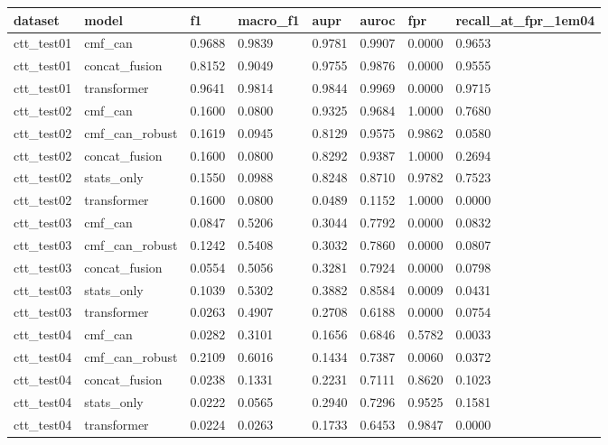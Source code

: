 \begin{tabular}{llllllll}
\toprule
dataset & model & f1 & macro\_f1 & aupr & auroc & fpr & recall\_at\_fpr\_1em04 \\
\midrule
ctt\_test01 & cmf\_can & 0.9688 & 0.9839 & 0.9781 & 0.9907 & 0.0000 & 0.9653 \\
ctt\_test01 & concat\_fusion & 0.8152 & 0.9049 & 0.9755 & 0.9876 & 0.0000 & 0.9555 \\
ctt\_test01 & transformer & 0.9641 & 0.9814 & 0.9844 & 0.9969 & 0.0000 & 0.9715 \\
ctt\_test02 & cmf\_can & 0.1600 & 0.0800 & 0.9325 & 0.9684 & 1.0000 & 0.7680 \\
ctt\_test02 & cmf\_can\_robust & 0.1619 & 0.0945 & 0.8129 & 0.9575 & 0.9862 & 0.0580 \\
ctt\_test02 & concat\_fusion & 0.1600 & 0.0800 & 0.8292 & 0.9387 & 1.0000 & 0.2694 \\
ctt\_test02 & stats\_only & 0.1550 & 0.0988 & 0.8248 & 0.8710 & 0.9782 & 0.7523 \\
ctt\_test02 & transformer & 0.1600 & 0.0800 & 0.0489 & 0.1152 & 1.0000 & 0.0000 \\
ctt\_test03 & cmf\_can & 0.0847 & 0.5206 & 0.3044 & 0.7792 & 0.0000 & 0.0832 \\
ctt\_test03 & cmf\_can\_robust & 0.1242 & 0.5408 & 0.3032 & 0.7860 & 0.0000 & 0.0807 \\
ctt\_test03 & concat\_fusion & 0.0554 & 0.5056 & 0.3281 & 0.7924 & 0.0000 & 0.0798 \\
ctt\_test03 & stats\_only & 0.1039 & 0.5302 & 0.3882 & 0.8584 & 0.0009 & 0.0431 \\
ctt\_test03 & transformer & 0.0263 & 0.4907 & 0.2708 & 0.6188 & 0.0000 & 0.0754 \\
ctt\_test04 & cmf\_can & 0.0282 & 0.3101 & 0.1656 & 0.6846 & 0.5782 & 0.0033 \\
ctt\_test04 & cmf\_can\_robust & 0.2109 & 0.6016 & 0.1434 & 0.7387 & 0.0060 & 0.0372 \\
ctt\_test04 & concat\_fusion & 0.0238 & 0.1331 & 0.2231 & 0.7111 & 0.8620 & 0.1023 \\
ctt\_test04 & stats\_only & 0.0222 & 0.0565 & 0.2940 & 0.7296 & 0.9525 & 0.1581 \\
ctt\_test04 & transformer & 0.0224 & 0.0263 & 0.1733 & 0.6453 & 0.9847 & 0.0000 \\
\bottomrule
\end{tabular}
